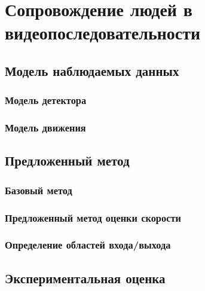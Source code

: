 \chapter{Сопровождение людей в видеопоследовательности} \label{chapt5}
\section{Модель наблюдаемых данных}
\subsection{Модель детектора}
\subsection{Модель движения}
\section{Предложенный метод}
\subsection{Базовый метод}
\subsection{Предложенный метод оценки скорости}
\subsection{Определение областей входа/выхода}
\section{Экспериментальная оценка}
